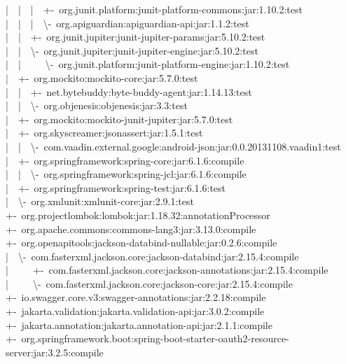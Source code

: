 |~~|~~|~~+-~org.junit.platform:junit-platform-commons:jar:1.10.2:test\\
|~~|~~|~~\textbackslash-~org.apiguardian:apiguardian-api:jar:1.1.2:test\\
|~~|~~+-~org.junit.jupiter:junit-jupiter-params:jar:5.10.2:test\\
|~~|~~\textbackslash-~org.junit.jupiter:junit-jupiter-engine:jar:5.10.2:test\\
|~~|~~~~~\textbackslash-~org.junit.platform:junit-platform-engine:jar:1.10.2:test\\
|~~+-~org.mockito:mockito-core:jar:5.7.0:test\\
|~~|~~+-~net.bytebuddy:byte-buddy-agent:jar:1.14.13:test\\
|~~|~~\textbackslash-~org.objenesis:objenesis:jar:3.3:test\\
|~~+-~org.mockito:mockito-junit-jupiter:jar:5.7.0:test\\
|~~+-~org.skyscreamer:jsonassert:jar:1.5.1:test\\
|~~|~~\textbackslash-~com.vaadin.external.google:android-json:jar:0.0.20131108.vaadin1:test\\
|~~+-~org.springframework:spring-core:jar:6.1.6:compile\\
|~~|~~\textbackslash-~org.springframework:spring-jcl:jar:6.1.6:compile\\
|~~+-~org.springframework:spring-test:jar:6.1.6:test\\
|~~\textbackslash-~org.xmlunit:xmlunit-core:jar:2.9.1:test\\
+-~org.projectlombok:lombok:jar:1.18.32:annotationProcessor\\
+-~org.apache.commons:commons-lang3:jar:3.13.0:compile\\
+-~org.openapitools:jackson-databind-nullable:jar:0.2.6:compile\\
|~~\textbackslash-~com.fasterxml.jackson.core:jackson-databind:jar:2.15.4:compile\\
|~~~~~+-~com.fasterxml.jackson.core:jackson-annotations:jar:2.15.4:compile\\
|~~~~~\textbackslash-~com.fasterxml.jackson.core:jackson-core:jar:2.15.4:compile\\
+-~io.swagger.core.v3:swagger-annotations:jar:2.2.18:compile\\
+-~jakarta.validation:jakarta.validation-api:jar:3.0.2:compile\\
+-~jakarta.annotation:jakarta.annotation-api:jar:2.1.1:compile\\
+-~org.springframework.boot:spring-boot-starter-oauth2-resource-server:jar:3.2.5:compile\\
